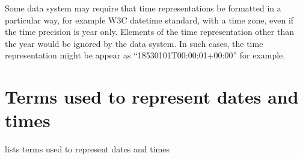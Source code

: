 \documentclass[letterpaper,10pt,english]{sphinxmanual}
\begin{document}
\sphinxAtStartPar
{}  Some data system may require that time representations
be formatted in a particular way, for example W3C datetime standard, with a time zone,
even if the time precision is year only.  Elements of the time representation other
than the year would be ignored by the data system.  In such cases, the time representation
might be appear as “1853\sphinxhyphen{}01\sphinxhyphen{}01T00:00:01+00:00” for example.


\section{Terms used to represent dates and times}
\label{\detokenize{datetimes:terms-used-to-represent-dates-and-times}}
\sphinxAtStartPar
{\hyperref[\detokenize{datetimes:table-14}]{}} lists terms used to represent dates and times
\end{document}
